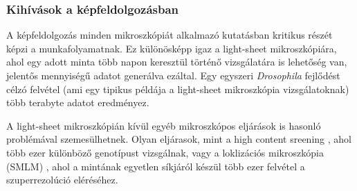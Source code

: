 \documentclass{booklet_style}
\begin{document}
\begin{figure}[bht]
\begin{subfigure}[b]{0.49\textwidth}
    \caption{}
    \label{fig:sizes}
  \end{subfigure}
  \label{fig:intro}
\end{figure}


\subsubsection{Kihívások a képfeldolgozásban}

A képfeldolgozás minden mikroszkópiát alkalmazó kutatásban kritikus részét képzi a munkafolyamatnak. Ez különösképp igaz a light-sheet mikroszkópiára, ahol egy adott minta több napon keresztül történő vizsgálatára is lehetőség van, jelentős mennyiségű adatot generálva ezáltal.
Egy egyszeri \textit{Drosophila} fejlődést célzó felvétel (ami egy tipikus példája a light-sheet mikroszkópia vizsgálatoknak) több terabyte adatot eredményez.

A light-sheet mikroszkópián kívül egyéb mikroszkópos eljárások is hasonló problémával szemesülhetnek. Olyan eljárasok, mint a high content sreening \cite{carpenter_systematic_2004,echeverri_high-throughput_2006,pepperkok_high-throughput_2006}, ahol több ezer különböző genotípust vizsgálnak, vagy a loklizációs mikroszkópia (SMLM) \cite{betzig_imaging_2006,hess_ultra-high_2006,rust_sub-diffraction-limit_2006}, ahol a mintának egyetlen síkjáról készül több ezer felvétel a szuperrezolúció eléréséhez.
\end{document}
